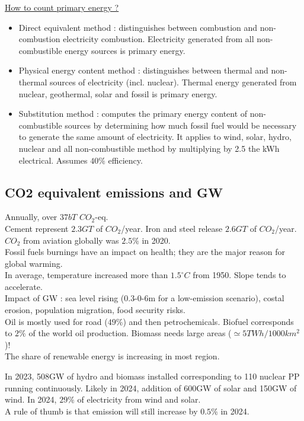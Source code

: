 \documentclass[../main.tex]{subfiles}
\begin{document}
\quad \underline{How to count primary energy ?}\\
\begin{itemize}
    \item Direct equivalent method : distinguishes between combustion and non-combustion electricity combustion. Electricity generated from all non-combustible energy sources is primary energy.
    \item Physical energy content method : distinguishes between thermal and non-thermal sources of electricity (incl. nuclear). Thermal energy generated from nuclear, geothermal, solar and fossil is primary energy.
    \item Substitution method : computes the primary energy content of non-combustible sources by determining how much fossil fuel would be necessary to generate the same amount of electricity. It applies to wind, solar, hydro, nuclear and all non-combustible method by multiplying by 2.5 the kWh electrical. Assumes $40\%$ efficiency.
\end{itemize}

\subsection{CO2 equivalent emissions and GW}
Annually, over $37bT$ $CO_2$-eq. \\
Cement represent $2.3GT$ of $CO_2$/year. Iron and steel release $2.6 GT$ of $CO_2$/year. $CO_2$ from aviation globally was $2.5\%$ in 2020.\\

Fossil fuels burnings have an impact on health; they are the major reason for global warming.\\
In average, temperature increased more than $1.5^\circ C$ from 1950. Slope tends to accelerate. \\

Impact of GW : sea level rising (0.3-0-6m for a low-emission scenario), costal erosion, population migration, food security risks. \\

Oil is mostly used for road ($49\%$) and then petrochemicals. Biofuel corresponds to $2\%$ of the world oil production. Biomass needs large areas ($\simeq 5TWh/1000km^2$)!\\
The share of renewable energy is increasing in most region. 

In 2023, 508GW of hydro and biomass installed corresponding to 110 nuclear PP running continuously. Likely in 2024, addition of 600GW of solar and 150GW of wind. In 2024, $29\%$ of electricity from wind and solar. \\
A rule of thumb is that emission will still increase by $0.5\%$ in 2024. \\
\end{document}
